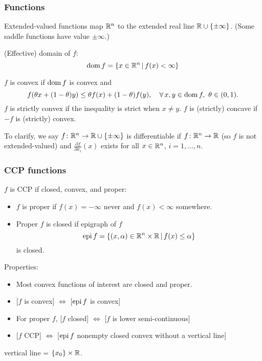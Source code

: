 \documentclass[10pt,mathserif]{beamer}
\begin{document}
\begin{frame}
\frametitle{Functions}
Extended-valued functions map $\mathbb{R}^n$ to the extended real line $ \mathbb{R}\cup\{\pm\infty\}$.
(Some saddle functions have value $\pm\infty$.)

\vspace{0.2in}

(Effective) domain of $f$:
\[
\mathrm{dom}\, f = \{x\in \mathbb{R}^n\,|\,f(x)<\infty\}
\]


\vspace{0.2in}

$f$ is convex if $\mathrm{dom}\, f $ is convex and
\[
    f(\theta x  + (1-\theta)y ) \le \theta f(x ) + (1-\theta)f(y ),\quad\forall\, x ,y \in\mathrm{dom}\, f,~\theta\in(0,1).
\]
$f$ is strictly convex if the inequality is strict when $x \ne y $.
$f$ is (strictly) concave if $-f$ is (strictly) convex.

\vspace{0.2in}

To clarify, we say $f\colon\mathbb{R}^n\rightarrow \mathbb{R}\cup\{\pm\infty\}$ is differentiable if
$f\colon\mathbb{R}^n\rightarrow \mathbb{R}$ (so $f$ is not extended-valued) and $\frac{\partial f}{\partial x_i}(x)$ exists for all $x\in \mathbb{R}^n$, $i=1,\dots,n$.


\end{frame}

\begin{frame}
\frametitle{CCP functions}
$f$ is CCP if closed, convex, and proper:
\begin{itemize}
\item
$f$ is proper if $f(x)=-\infty$ never and $f(x)<\infty$ somewhere.
\item
Proper $f$ is closed if epigraph of $f$
\[
    \mathrm{epi}\, f = \{(x ,\alpha)\in\mathbb{R}^n\times \mathbb{R}\,|\, f(x )\le \alpha\}
\]
 is closed.
\end{itemize}
\vspace{0.2in}

Properties:
\begin{itemize}
\item
Most convex functions of interest are closed and proper.
\item

[$f$ is convex] $\Leftrightarrow$ [$\mathrm{epi}\, f$ is convex]
\item
For proper $f$,  [$f$ closed] $\Leftrightarrow$ [$f$ is lower semi-continuous]
\item

[$f$ CCP]  $\Leftrightarrow$  [$\mathrm{epi}\, f$ nonempty closed convex without a vertical line]
\end{itemize}
vertical line = $\{x_0\}\times\mathbb{R}$.


\end{frame}
\end{document}

